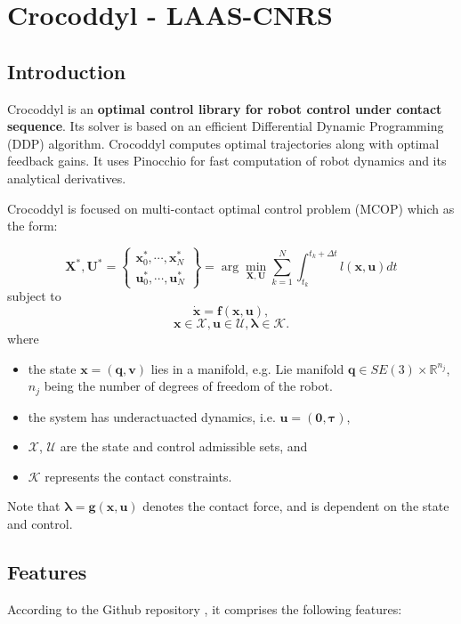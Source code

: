 \chapter{Crocoddyl - LAAS-CNRS}\label{chapter1}
\section{Introduction} 
Crocoddyl is an \textbf{optimal control library for robot control under contact sequence}. Its solver is based on an efficient Differential Dynamic Programming (DDP) algorithm. Crocoddyl computes optimal trajectories along with optimal feedback gains. It uses Pinocchio for fast computation of robot dynamics and its analytical derivatives. 

Crocoddyl is focused on multi-contact optimal control problem (MCOP) which as the form:

$$\mathbf{X}^*,\mathbf{U}^*=
\begin{Bmatrix} \mathbf{x}^*_0,\cdots,\mathbf{x}^*_N \\
				  \mathbf{u}^*_0,\cdots,\mathbf{u}^*_N
\end{Bmatrix} =
\arg\min_{\mathbf{X},\mathbf{U}} \sum_{k=1}^N \int_{t_k}^{t_k+\Delta t} l(\mathbf{x},\mathbf{u})dt$$
subject to
$$ \mathbf{\dot{x}} = \mathbf{f}(\mathbf{x},\mathbf{u}),$$
$$ \mathbf{x}\in\mathcal{X}, \mathbf{u}\in\mathcal{U}, \boldsymbol{\lambda}\in\mathcal{K}.$$
where
\begin{itemize}
\item the state $\mathbf{x}=(\mathbf{q},\mathbf{v})$ lies in a manifold, e.g. Lie manifold $\mathbf{q}\in SE(3)\times \mathbb{R}^{n_j}$, $n_j$ being the number of degrees of freedom of the robot.
\item the system has underactuacted dynamics, i.e. $\mathbf{u}=(\mathbf{0},\boldsymbol{\tau})$,
\item $\mathcal{X}$, $\mathcal{U}$ are the state and control admissible sets, and
\item $\mathcal{K}$ represents the contact constraints.
\end{itemize}

 
 Note that $\boldsymbol{\lambda}=\mathbf{g}(\mathbf{x},\mathbf{u})$ denotes the contact force, and is dependent on the state and control.
 
\section{Features}
According to the Github repository \cite{crocoddylweb}, it comprises the following features:

